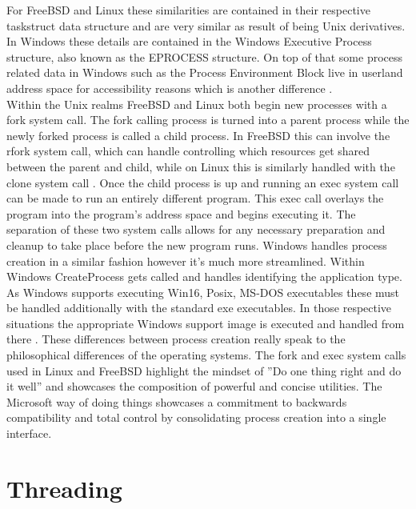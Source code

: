 \documentclass[letterpaper,10pt,draftclsnofoot,onecolumn]{IEEEtran}
\begin{document}
For FreeBSD and Linux these similarities are contained in their respective task\textunderscore struct data structure and are very similar as result of being Unix derivatives. In Windows these details are contained in the Windows Executive Process structure, also known as the EPROCESS structure. On top of that some process related data in Windows such as the Process Environment Block live in userland address space for accessibility reasons which is another difference \cite{russinovich}.\\

Within the Unix realms FreeBSD and Linux both begin new processes with a fork system call. The fork calling process is turned into a parent process while the newly forked process is called a child process. In FreeBSD this can involve the rfork system call, which can handle controlling which resources get shared between the parent and child, while on Linux this is similarly handled with the clone system call \cite{love}. Once the child process is up and running an exec system call can be made to run an entirely different program. This exec call overlays the program into the program’s address space and begins executing it. The separation of these two system calls allows for any necessary preparation and cleanup to take place before the new program runs. Windows handles process creation in a similar fashion however it’s much more streamlined. Within Windows CreateProcess gets called and handles identifying the application type. As Windows supports executing Win16, Posix, MS-DOS executables these must be handled additionally with the standard exe executables. In those respective situations the appropriate Windows support image is executed and handled from there \cite{russinovich}. These differences between process creation really speak to the philosophical differences of the operating systems. The fork and exec system calls used in Linux and FreeBSD highlight the mindset of ''Do one thing right and do it well'' and showcases the composition of powerful and concise utilities. The Microsoft way of doing things showcases a commitment to backwards compatibility and total control by consolidating process creation into a single interface.\\

\newpage
\section{Threading}
\end{document}
